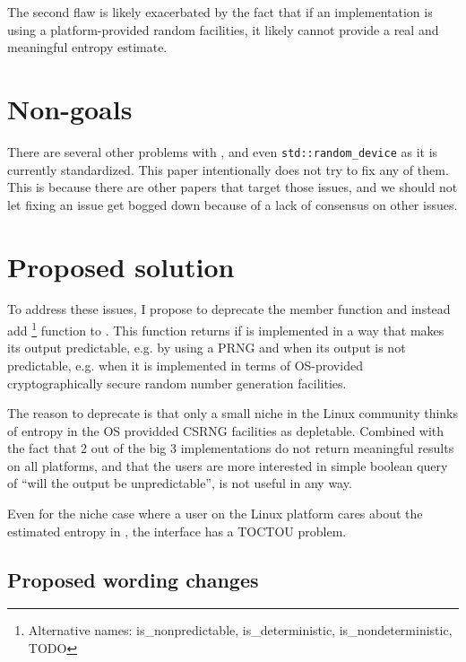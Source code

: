 \documentclass{wg21}
\begin{document}
The second flaw is likely exacerbated by the fact that if an implementation
is using a platform-provided random facilities, it likely cannot provide
a real and meaningful entropy estimate.

\hypertarget{non-goals}{%
    \section{Non-goals}\label{non-goals}}

There are several other problems with , and even
\texttt{std::random_device} as it is currently standardized. This paper
intentionally does not try to fix any of them.
This is because there are other papers that target those issues, and we
should not let fixing an issue get bogged down because of a lack of consensus
on other issues.


\hypertarget{proposed-solution}{%
    \section{Proposed solution}\label{proposed-solution}}

To address these issues, I propose to deprecate the 
member function and instead add %
\footnote{Alternative names: is_nonpredictable, is_deterministic, is_nondeterministic, TODO}
function to . This function returns  if
\mbox{} is implemented in a way that makes its
output predictable, e.g. by using a PRNG and  when its output
is not predictable, e.g. when it is implemented in terms of OS-provided
cryptographically secure random number generation facilities.

The reason to deprecate  is that only a small niche in
the Linux community thinks of entropy in the OS providded CSRNG facilities
as depletable. Combined with the fact that 2 out of the big 3
implementations do not return meaningful results on all platforms, and
that the users are more interested in simple boolean query of ``will
the output be unpredictable'',  is not useful in any way.

Even for the niche case where a user on the Linux platform cares about
the estimated entropy in , the interface has a TOCTOU
problem.


\hypertarget{constexpr-query-wording}{%
    \subsection{Proposed wording changes}\label{constexpr-query-wording}}
\end{document}
